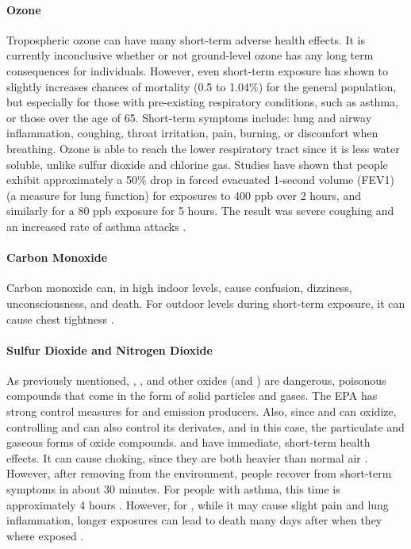 \paragraph{Ozone}
Tropospheric ozone can have many short-term adverse health effects. It is
currently inconclusive whether or not ground-level ozone has any long term
consequences for individuals. However, even short-term exposure has shown to
slightly increases chances of mortality (0.5 to 1.04\%) for the general
population, but especially for those with pre-existing respiratory conditions,
such as asthma, or those over the age of 65. Short-term symptoms include: lung
and airway inflammation, coughing, throat irritation, pain, burning, or
discomfort when breathing. Ozone is able to reach the lower respiratory tract
since it is less water soluble, unlike sulfur dioxide and chlorine gas. Studies
have shown that people exhibit approximately a 50\% drop in forced evacuated
1-second volume (FEV1) (a measure for lung function) for exposures to 400 ppb
over 2 hours, and similarly for a 80 ppb exposure for 5 hours. The result was
severe coughing and an increased rate of asthma attacks
\cite{epa-ozone-health-effects}.

\paragraph{Carbon Monoxide}
Carbon monoxide can, in high indoor levels, cause confusion, dizziness,
unconsciousness, and death. For outdoor levels during short-term exposure, it
can cause chest tightness \cite{epa-co-basics}.

\paragraph{Sulfur Dioxide and Nitrogen Dioxide}
As previously mentioned, \sdo, \ndo, and other oxides (\sox and \nox) are
dangerous, poisonous compounds that come in the form of solid particles and
gases. The EPA has strong control measures for \sdo and \ndo emission producers.
Also, since \sdo and \ndo can oxidize, controlling \sdo and \ndo can also
control its derivates, and in this case, the particulate and gaseous forms of
oxide compounds. \sdo and \ndo have immediate, short-term health effects.  It
can cause choking, since they are both heavier than normal air
\cite{epa-so2-basics}.  However, after removing \sdo from the environment,
people recover from short-term symptoms in about 30 minutes. For people with
asthma, this time is approximately 4 hours
\cite{health-impacts-air-pollution-review}. However, for \ndo, while it may
cause slight pain and lung inflammation, longer exposures can lead to death many
days after when they where exposed \cite{pubchem-no2}.

